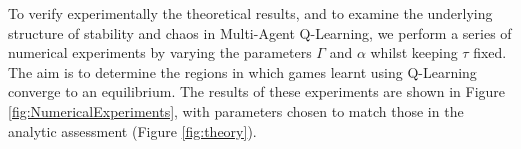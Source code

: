 \documentclass[sigconf]{aamas}
\begin{document}
To verify experimentally the theoretical results, and to examine the underlying structure of stability and chaos in
Multi-Agent Q-Learning, we perform a series of numerical experiments by varying the parameters $\Gamma$ and
$\alpha$ whilst keeping $\tau$ fixed. The aim is to determine the regions in which games learnt using Q-Learning converge to an equilibrium. The results of these experiments are shown in Figure \ref{fig:NumericalExperiments}, with parameters chosen to match those in the analytic assessment (Figure \ref{fig:theory}).



\end{document}
